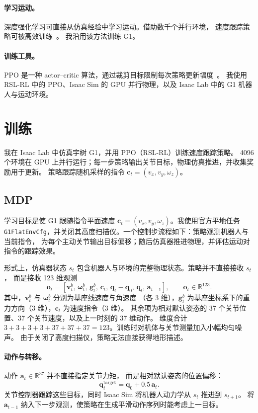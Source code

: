\documentclass[11pt,a4paper]{article}
\begin{document}
\paragraph{学习运动。}
深度强化学习可直接从仿真经验中学习运动。借助数千个并行环境，
速度跟踪策略可被高效训练~\citep{rudin2022legged}。
我沿用该方法训练 G1。

\paragraph{训练工具。}
PPO 是一种 actor--critic 算法，通过裁剪目标限制每次策略更新幅度~\citep{schulman2017ppo}。
我使用 RSL-RL 中的 PPO、Isaac Sim 的 GPU 并行物理，以及 Isaac Lab 中的
G1 机器人与运动环境。

\section{训练}
\label{sec:train}

我在 Isaac Lab 中仿真宇树 G1，并用 PPO（RSL-RL）训练速度跟踪策略。
4096 个环境在 GPU 上并行运行；每一步策略输出关节目标，物理仿真推进，并收集奖励用于更新。
策略跟踪随机采样的指令 $\mathbf{c}_t = (v_x, v_y, \omega_z)$。

\subsection{MDP}

学习目标是使 G1 跟随指令平面速度
$\mathbf{c}_t=(v_x,v_y,\omega_z)$。我使用官方平地任务
\texttt{G1FlatEnvCfg}，并关闭其高度扫描仪。一个控制步流程如下：策略观测机器人与当前指令，
为每个主动关节输出目标偏移；随后仿真器推进物理，并评估运动对指令的跟踪效果。

形式上，仿真器状态 $s_t$ 包含机器人与环境的完整物理状态。策略并不直接接收 $s_t$，
而是接收 123 维观测
\[
\mathbf{o}_t =
\left[
\mathbf{v}^{b}_t,\,
\boldsymbol{\omega}^{b}_t,\,
\mathbf{g}^{b}_t,\,
\mathbf{c}_t,\,
\mathbf{q}_t-\mathbf{q}_{0},\,
\dot{\mathbf{q}}_t,\,
\mathbf{a}_{t-1}
\right],
\qquad \mathbf{o}_t\in\mathbb{R}^{123}.
\]
其中，$\mathbf{v}^{b}_t$ 与 $\boldsymbol{\omega}^{b}_t$ 分别为基座线速度与角速度
（各 3 维），$\mathbf{g}^{b}_t$ 为基座坐标系下的重力方向（3 维），$\mathbf{c}_t$ 为速度指令（3 维）。
其余项为相对默认姿态的 37 个关节位置、37 个关节速度，以及上一时刻的 37 维动作。
维度合计 $3+3+3+3+37+37+37=123$。训练时对机体与关节测量加入小幅均匀噪声。
由于关闭了高度扫描仪，策略无法直接获得地形描述。

\paragraph{动作与转移。}
动作 $\mathbf{a}_t\in\mathbb{R}^{37}$ 并不直接指定关节力矩，
而是相对默认姿态的位置偏移：
\[
\mathbf{q}^{\mathrm{target}}_t
=\mathbf{q}_{0}+0.5\,\mathbf{a}_t.
\]
关节控制器跟踪这些目标，同时 Isaac Sim 将机器人动力学从 $s_t$ 推进到 $s_{t+1}$。
将 $\mathbf{a}_{t-1}$ 纳入下一步观测，使策略在生成平滑动作序列时能考虑上一目标。
\end{document}

